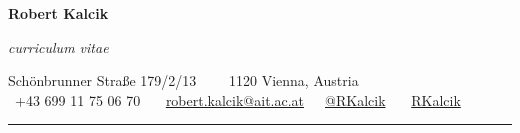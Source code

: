 \documentclass[11pt, a4paper]{article}
\begin{document}
\begin{center}
{\LARGE \textbf{Robert Kalcik}}

\emph{curriculum vitae}
\vspace{6pt}

Schönbrunner Straße 179/2/13\ \ \textbullet
\ \ 1120 Vienna, Austria
\\
\faMobile \ +43 699 11 75 06 70 \ \ \faPaperPlane \ \href{mailto:robert.kalcik@ait.ac.at}{robert.kalcik@ait.ac.at}\ \ \faTwitter \ \href{https://twitter.com/RKalcik}{@RKalcik} \ \ \faLinkedin \ \href{https://www.linkedin.com/in/rkalcik}{RKalcik}
\vspace{-5pt}
\end{center}

\hrule
\vspace{0em}

%
\end{document}
